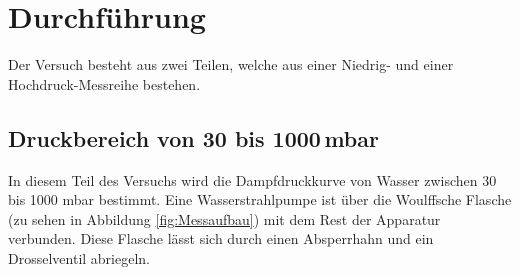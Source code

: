 \section{Durchführung}
\label{sec:Durchführung}

Der Versuch besteht aus zwei Teilen, welche aus einer Niedrig- und einer Hochdruck-Messreihe bestehen.
\subsection{Druckbereich von 30 bis 1000\,mbar}
In diesem Teil des Versuchs wird die Dampfdruckkurve von Wasser zwischen 30 bis 1000 mbar bestimmt.
Eine Wasserstrahlpumpe ist über die Woulffsche Flasche (zu sehen in Abbildung \ref{fig:Messaufbau}) mit dem Rest der Apparatur verbunden.
Diese Flasche lässt sich durch einen Absperrhahn und ein Drosselventil abriegeln.\\ 
